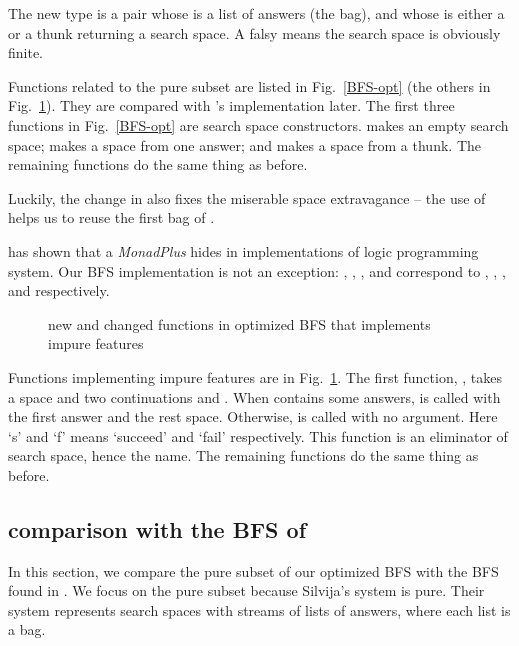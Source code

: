 \documentclass[format=acmlarge, review=true, authordraft=true]{acmart}
\begin{document}
The new type is a pair whose  is a list of answers (the bag), and 
whose  is either a  or a thunk returning a search 
space. A falsy  means the search space is obviously finite. 

Functions related to the pure subset are listed in Fig.~\ref{BFS-opt} (the 
others in Fig.~\ref{BFS-opt-cont}). They are compared with 
\citeauthor{seres1999algebra}'s implementation later. The first three functions 
in Fig.~\ref{BFS-opt} are search space constructors.  makes an 
empty search space;  makes a space from one answer; and 
 makes a space from a thunk. The remaining functions do the same 
thing as before. 

Luckily, the change in  also fixes the miserable space 
extravagance -- the use of  helps us to reuse the first bag of 
.

\citet{kiselyov2005backtracking} has shown that a \emph{MonadPlus} hides in 
implementations of logic programming system. Our BFS implementation is not an 
exception: , , , and 
 correspond to , , , 
and  respectively.

\begin{figure}
	\caption{new and changed functions in optimized BFS that implements impure 
		features}
	\label{BFS-opt-cont}
\end{figure}

Functions implementing impure features are in Fig.~\ref{BFS-opt-cont}. The 
first function, , takes a space  and two 
continuations  and . When  contains some 
answers,  is called with the first answer and the rest space. 
Otherwise,  is called with no argument. Here `s' and `f' means 
`succeed' and `fail' respectively. This function is an eliminator of search 
space, hence the name. The remaining functions do the same thing as before.

\subsection{comparison with the BFS of \citet{seres1999algebra}}

In this section, we compare the pure subset of our optimized BFS with the BFS 
found in \citet{seres1999algebra}. We focus on the pure subset because 
Silvija's system is pure. Their system represents search spaces with streams of 
lists of answers, where each list is a bag.
\end{document}

